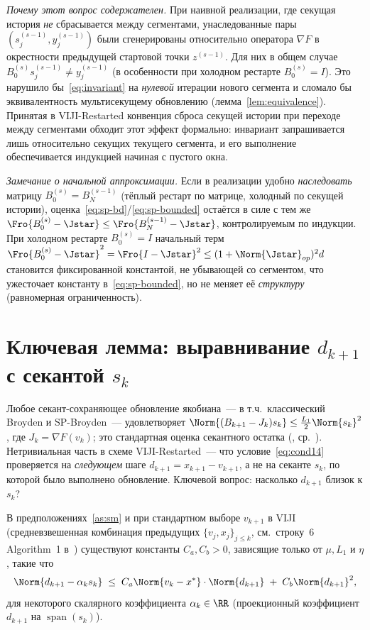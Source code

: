 \begin{remark}
\emph{Почему этот вопрос содержателен.} При наивной реализации, где
секущая история \emph{не} сбрасывается между сегментами, унаследованные
пары $(s_j^{(s-1)}, y_j^{(s-1)})$ были сгенерированы относительно
оператора $\nabla F$ в окрестности предыдущей стартовой точки
$z^{(s-1)}$. Для них в общем случае
$B_0^{(s)} s_j^{(s-1)} \ne y_j^{(s-1)}$ (в особенности при холодном
рестарте $B_0^{(s)} = I$). Это нарушило бы~\eqref{eq:invariant} на
\emph{нулевой} итерации нового сегмента и сломало бы эквивалентность
мультисекущему обновлению (лемма~\ref{lem:equivalence}). Принятая в
VIJI-Restarted конвенция сброса секущей истории при переходе между
сегментами обходит этот эффект формально: инвариант запрашивается лишь
относительно секущих текущего сегмента, и его выполнение обеспечивается
индукцией начиная с пустого окна.

\emph{Замечание о начальной аппроксимации.} Если в реализации удобно
\emph{наследовать} матрицу $B_0^{(s)} = B_{N}^{(s-1)}$ (тёплый рестарт по
матрице, холодный по секущей истории),
оценка~\eqref{eq:sp-bd}/\eqref{eq:sp-bounded} остаётся в силе с тем же
$\Fro{B_0^{(s)} - \Jstar} \le \Fro{B_{N}^{(s-1)} - \Jstar}$, контролируемым
по индукции. При холодном рестарте $B_0^{(s)} = I$ начальный
терм $\Fro{B_0^{(s)} - \Jstar}^2 = \Fro{I - \Jstar}^2 \le (1+\Norm{\Jstar}_{op})^2 d$
становится фиксированной константой, не убывающей со сегментом, что
ужесточает константу в~\eqref{eq:sp-bounded}, но не меняет её
\emph{структуру} (равномерная ограниченность).
\end{remark}

\section{Ключевая лемма: выравнивание $d_{k+1}$ с секантой $s_k$}
\label{sec:viji:key-lemma}

Любое секант-сохраняющее обновление якобиана~--- в т.ч.\ классический
Broyden и SP-Broyden~--- удовлетворяет
$\Norm{(B_{k+1} - J_k) s_k} \le \tfrac{L_1}{2}\Norm{s_k}^2$, где
$J_k = \nabla F(v_k)$; это стандартная оценка секантного остатка
(\cite[Lemma~4.1.12]{dennis1996}, ср.\ \cite{dennis1977}). Нетривиальная
часть в схеме VIJI-Restarted~--- что условие~\eqref{eq:cond14} проверяется
на \emph{следующем} шаге $d_{k+1} = x_{k+1} - v_{k+1}$, а не на секанте
$s_k$, по которой было выполнено обновление. Ключевой вопрос: насколько
$d_{k+1}$ близок к $s_k$?

\begin{lemma}
\label{lem:alignment}
В предположениях~\ref{as:sm} и при стандартном выборе $v_{k+1}$ в
VIJI (средневзвешенная комбинация предыдущих $\{v_j, x_j\}_{j\le k}$, см.\
строку~6 Algorithm~1 в~\cite{Agafonov2024VIJI}) существуют константы
$C_a, C_b > 0$, зависящие только от $\mu, L_1$ и $\eta$, такие что
\[
\Norm{d_{k+1} - \alpha_k s_k}
\;\le\;
C_a \Norm{v_k - x^{*}} \cdot \Norm{d_{k+1}}
\;+\;
C_b \Norm{d_{k+1}}^2,
\]
для некоторого скалярного коэффициента $\alpha_k \in \RR$ (проекционный
коэффициент $d_{k+1}$ на $\operatorname{span}(s_k)$).
\end{lemma}


